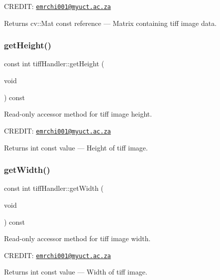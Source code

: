 C\+R\+E\+D\+IT\+: \href{mailto:emrchi001@myuct.ac.za}{\tt emrchi001@myuct.\+ac.\+za}

\begin{DoxyReturn}{Returns}
cv\+::\+Mat const reference --- Matrix containing tiff image data. 
\end{DoxyReturn}
\mbox{\label{classtiffHandler_a6e5e39cefdee5f9712a512ddb80af2a6}} 
\subsubsection{\texorpdfstring{get\+Height()}{getHeight()}}
{\footnotesize\ttfamily const int tiff\+Handler\+::get\+Height (\begin{DoxyParamCaption}\item[{void}]{ }\end{DoxyParamCaption}) const}



Read-\/only accessor method for tiff image height. 

C\+R\+E\+D\+IT\+: \href{mailto:emrchi001@myuct.ac.za}{\tt emrchi001@myuct.\+ac.\+za}

\begin{DoxyReturn}{Returns}
int const value --- Height of tiff image. 
\end{DoxyReturn}
\mbox{\label{classtiffHandler_a331aa1ba8bdb2f337f6272e85e38e620}} 
\subsubsection{\texorpdfstring{get\+Width()}{getWidth()}}
{\footnotesize\ttfamily const int tiff\+Handler\+::get\+Width (\begin{DoxyParamCaption}\item[{void}]{ }\end{DoxyParamCaption}) const}



Read-\/only accessor method for tiff image width. 

C\+R\+E\+D\+IT\+: \href{mailto:emrchi001@myuct.ac.za}{\tt emrchi001@myuct.\+ac.\+za}

\begin{DoxyReturn}{Returns}
int const value --- Width of tiff image. 
\end{DoxyReturn}
\mbox{\label{classtiffHandler_a316fecb1eba714d89b378570227a9e41}} 
